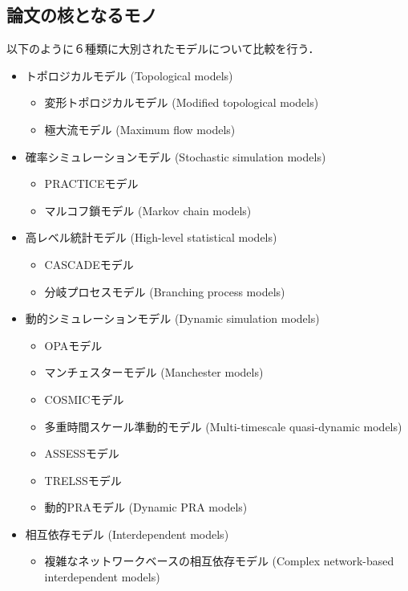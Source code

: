 \documentclass[a4paper,11pt]{jsarticle}
\begin{document}
    \subsection{論文の核となるモノ}
    以下のように６種類に大別されたモデルについて比較を行う．
    \begin{itemize}
      \item トポロジカルモデル (Topological models)
      \begin{itemize}
        \item 変形トポロジカルモデル (Modified topological models)
        \item 極大流モデル (Maximum flow models)
      \end{itemize}
      \item 確率シミュレーションモデル (Stochastic simulation models)
      \begin{itemize}
        \item PRACTICEモデル
        \item マルコフ鎖モデル (Markov chain models)
      \end{itemize}
      \item 高レベル統計モデル (High-level statistical models)
      \begin{itemize}
        \item CASCADEモデル
        \item 分岐プロセスモデル (Branching process models)
      \end{itemize} 
      \item 動的シミュレーションモデル (Dynamic simulation models)
      \begin{itemize}
        \item OPAモデル
        \item マンチェスターモデル (Manchester models)
        \item COSMICモデル
        \item 多重時間スケール準動的モデル (Multi-timescale quasi-dynamic models)
        \item ASSESSモデル
        \item TRELSSモデル
        \item 動的PRAモデル (Dynamic PRA models)
      \end{itemize}
      \item 相互依存モデル (Interdependent models)
      \begin{itemize}
        \item 複雑なネットワークベースの相互依存モデル (Complex network-based interdependent models)

\end{itemize}
\end{itemize}
\end{document}
